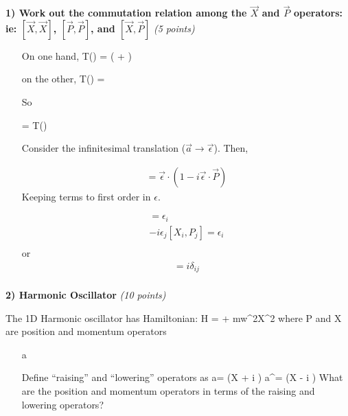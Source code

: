 {\large
\textbf{1) Work out the commutation relation among the $\vec{X}$ and $\vec{P}$ operators: \\ ie: $[\vec{X},\vec{X}]$,  $[\vec{P},\vec{P}]$, and $[\vec{X},\vec{P}]$ } \hfill \textit{(5 points)}
\begin{itemize}
\item[] {
On one hand,
\be
{}T()  = ( + ) 
\ee

on the other,
\be
T()  =   
\ee

So

 =  T()
\ee

Consider the infinitesimal translation ($\vec{a} \rightarrow \vec{\epsilon}$).  Then,

\begin{eqnarray*}
[\vec{X},1- i \vec{\epsilon} \cdot \vec{P}] = \vec{\epsilon} \cdot (1- i \vec{\epsilon} \cdot \vec{P})
\end{eqnarray*}
Keeping terms to first order in $\epsilon$. 

\begin{eqnarray*}
[X_i,1- i \epsilon_j P_j] = \epsilon_i\\
-i \epsilon_j [X_i,P_j] = \epsilon_i\\
\end{eqnarray*}
or
\begin{eqnarray*}
[X_i,P_j] = i \delta_{ij}\\
\end{eqnarray*}


}
\end{itemize}




\vspace*{0.25in}

{\large
\textbf{2) Harmonic Oscillator } \hfill \textit{(10 points)}

The 1D Harmonic oscillator has Hamiltonian:
\be
H =  + mw^2X^2
\ee
where P and X are position and momentum operators

\begin{itemize}
\item[a]{ Define ``raising'' and ``lowering'' operators as 
\be
a= \left(X + i \right) \hspace{0.5in} a^\dagger = \left(X - i \right)
\ee
What are the position and momentum operators in terms of the raising and lowering operators?

}
\end{itemize}}}
